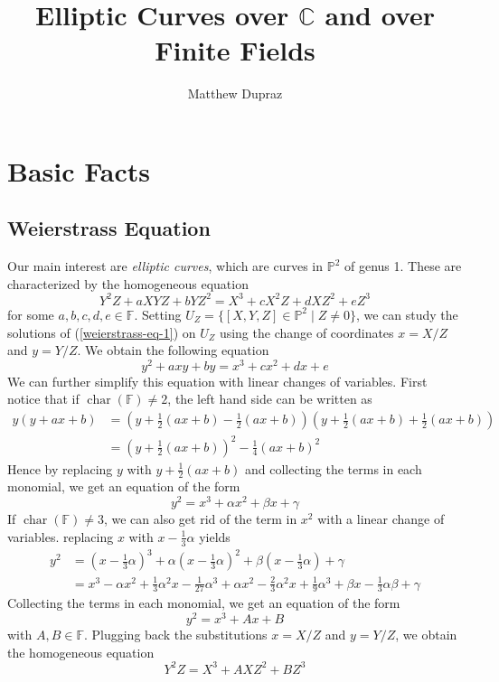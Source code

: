 \documentclass{article}
\author{Matthew Dupraz}
\title{Elliptic Curves over $\mathbb{C}$ and over Finite Fields}
\theoremstyle{definition}
\theoremstyle{remark}
\newcommand{\proj}{\mathbb{P}}
\newcommand{\F}{\mathbb{F}}
\newcommand{\chr}{\operatorname{char}}
\begin{document}
\maketitle

\section{Basic Facts}

\subsection{Weierstrass Equation}

Our main interest are \emph{elliptic curves}, which are curves
in $\proj^2$ of genus 1. These are characterized by the
homogeneous equation
\begin{equation}
	\label{weierstrass-eq-1}
	Y^2Z + aXYZ + bYZ^2 = X^3 + cX^2Z + dXZ^2 + eZ^3
\end{equation}
for some $a, b, c, d, e \in \F$.
Setting $U_Z = \{[X, Y, Z] \in \proj^2 \mid Z \neq 0\}$, we can
study the solutions of (\ref{weierstrass-eq-1}) on
$U_Z$ using the change of coordinates $x = X/Z$
and $y = Y/Z$. We obtain the following equation
\begin{equation}
	\label{weierstrass-eq-2}
	y^2 + axy + by = x^3 + cx^2 + dx + e
\end{equation}
We can further simplify this equation with linear
changes of variables. First notice that if $\chr(\F) \neq 2$,
the left hand side can be
written as
\begin{align*}
	y(y + ax + b) &= (y + \frac{1}{2}(ax + b) - \frac{1}{2}(ax + b))
	(y + \frac{1}{2}(ax + b) + \frac{1}{2}(ax + b))\\
	&= (y + \frac{1}{2}(ax + b))^2 - \frac{1}{4}(ax + b)^2
\end{align*}
Hence by replacing $y$ with $y + \frac{1}{2}(ax + b)$ and
collecting the terms in each monomial, we get an equation
of the form
\begin{equation}
	y^2 = x^3 + \alpha x^2 + \beta x + \gamma
\end{equation}
If $\chr(\F) \neq 3$, we can also get rid of the term in 
$x^2$ with a linear change
of variables. replacing $x$ with $x - \frac{1}{3}\alpha$ yields
\begin{align*}
	y^2 &= (x - \frac{1}{3}\alpha)^3 + \alpha(x-\frac{1}{3}\alpha)^2
	+ \beta(x - \frac{1}{3}\alpha) + \gamma\\
	&= x^3 - \alpha x^2 + \frac{1}{3}\alpha^2 x
	- \frac{1}{27}\alpha^3 + \alpha x^2 - \frac{2}{3}\alpha^2 x
	+ \frac{1}{9}\alpha^3 + \beta x - \frac{1}{3}\alpha \beta
	+ \gamma
\end{align*}
Collecting the terms in each monomial, we get an equation of the
form
\begin{equation}
	y^2 = x^3 + Ax + B
\end{equation}
with $A, B \in \F$.
Plugging back the substitutions $x = X/Z$ and $y = Y/Z$, we obtain
the homogeneous equation
\begin{equation}
	Y^2Z = X^3 + AXZ^2 + BZ^3
\end{equation}
\end{document}
